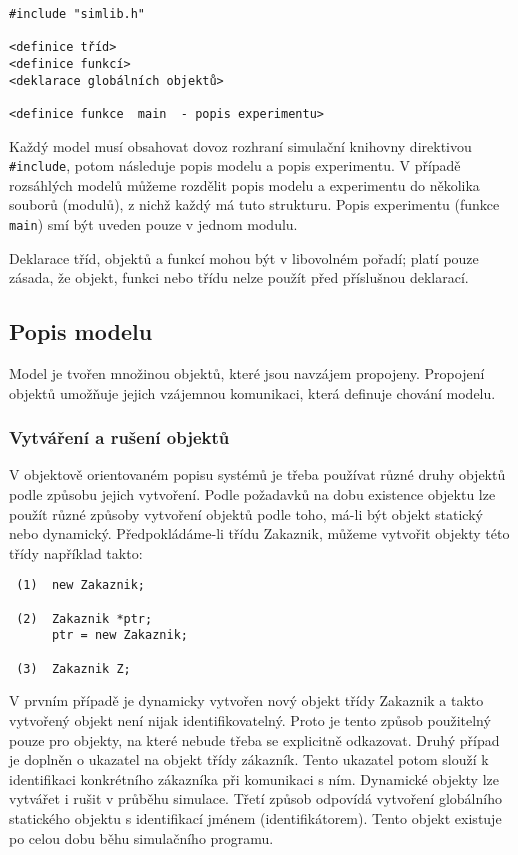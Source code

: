 \documentclass[a4paper]{article}
\begin{document}
\begin{verbatim}
#include "simlib.h"

<definice tříd>
<definice funkcí>
<deklarace globálních objektů>

<definice funkce  main  - popis experimentu>
\end{verbatim}

Každý model musí obsahovat dovoz rozhraní simulační knihovny
direktivou \verb|#include|, potom následuje popis modelu a popis
experimentu. V případě rozsáhlých modelů můžeme rozdělit popis
modelu a experimentu do několika souborů (modulů), z nichž každý
má tuto strukturu. Popis experimentu (funkce \verb|main|) smí být
uveden pouze v jednom modulu.

Deklarace tříd, objektů a funkcí mohou být v libovolném pořadí;
platí pouze zásada, že objekt, funkci nebo třídu nelze použít
před příslušnou deklarací.


\subsection{Popis modelu}

Model je tvořen množinou objektů, které jsou navzájem propojeny.
Propojení objektů umožňuje jejich vzájemnou komunikaci, která
definuje chování modelu.


\subsubsection{Vytváření a rušení objektů}

V objektově orientovaném popisu systémů je třeba používat různé
druhy objektů podle způsobu jejich vytvoření. Podle požadavků na
dobu existence objektu lze použít různé způsoby vytvoření
objektů podle toho, má-li být objekt statický nebo dynamický.
Předpokládáme-li třídu Zakaznik, můžeme vytvořit objekty této
třídy například takto:

\begin{verbatim}
 (1)  new Zakaznik;

 (2)  Zakaznik *ptr;
      ptr = new Zakaznik;

 (3)  Zakaznik Z;
\end{verbatim}

V prvním případě je dynamicky vytvořen nový objekt třídy
Zakaznik a takto vytvořený objekt není nijak identifikovatelný.
Proto je tento způsob použitelný pouze pro objekty, na které
nebude třeba se explicitně odkazovat. Druhý případ je doplněn
o ukazatel na objekt třídy zákazník. Tento ukazatel potom slouží
k identifikaci konkrétního zákazníka při komunikaci s ním.
Dynamické objekty lze vytvářet i rušit v průběhu simulace. Třetí
způsob odpovídá vytvoření globálního statického objektu
s identifikací jménem (identifikátorem). Tento objekt existuje
po celou dobu běhu simulačního programu.
\end{document}
